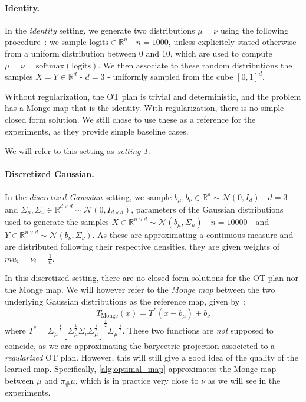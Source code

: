 \documentclass[a4paper,11pt]{article}
\newcommand{\R}{\mathbb{R}}
\newcommand{\1}{\mathbbm{1}}
\begin{document}
\paragraph{Identity.}In the \emph{identity} setting, we generate two distributions $\mu = \nu$ using the following procedure~: we sample $\mathrm{logits} \in \R^{n}$ - $n = 1000$, unless explicitely stated otherwise - from a uniform distribution between $0$ and $10$, which are used to compute $\mu = \nu = \mathrm{softmax}(\mathrm{logits})$. We then associate to these random distributions the samples $X = Y \in \R^d$ - $d = 3$ - uniformly sampled from the cube $[0, 1]^d$.

Without regularization, the OT plan is trivial and deterministic, and the problem has a Monge map that is the identity. With regularization, there is no simple closed form solution. We still chose to use these as a reference for the experiments, as they provide simple baseline cases.

We will refer to this setting as \emph{setting 1}.

\paragraph{Discretized Gaussian.}In the \emph{discretized Gaussian} setting, we sample $b_{\mu}, b_{\nu} \in \R^d \sim \mathcal{N}(0, I_d)$ - $d = 3$ - and $\Sigma_{\mu}, \Sigma_{\nu} \in \R^{d \times d} \sim \mathcal{N}(0, I_{d \times d})$, parameters of the Gaussian distributions used to generate the samples $X \in \R^{n \times d} \sim \mathcal{N}(b_{\mu}, \Sigma_{\mu})$ - $n = 10000$ - and $Y \in \R^{n \times d} \sim \mathcal{N}(b_{\nu}, \Sigma_{\nu})$. As these are approximating a continuous measure and are distributed following their respective densities, they are given weights of $mu_i = \nu_i = \frac{1}{n}$.

In this discretized setting, there are no closed form solutions for the OT plan nor the Monge map. We will however refer to the \emph{Monge map} between the two underlying Gaussian distributions as the reference map, given by~:
\begin{equation}
    T_{\mathrm{Monge}}(x) = T^{*}(x - b_{\mu}) + b_{\nu}
\end{equation}
where $T^{*} = \Sigma_{\mu}^{-\frac{1}{2}}\left[
    \Sigma_{\mu}^{\frac{1}{2}}\Sigma_{\nu}\Sigma_{\mu}^{\frac{1}{2}}
\right]^{\frac{1}{2}}\Sigma_{\mu}^{-\frac{1}{2}}$. These two functions are \emph{not} supposed to coincide, as we are approximating the barycetric projection associeted to a \emph{regularized} OT plan. However, this will still give a good idea of the quality of the learned map. Specifically, \cref{alg:optimal_map} approximates the Monge map between $\mu$ and $\widetilde{\pi}_{\#}\mu$, which is in practice very close to $\nu$ as we will see in the experiments.
\end{document}
